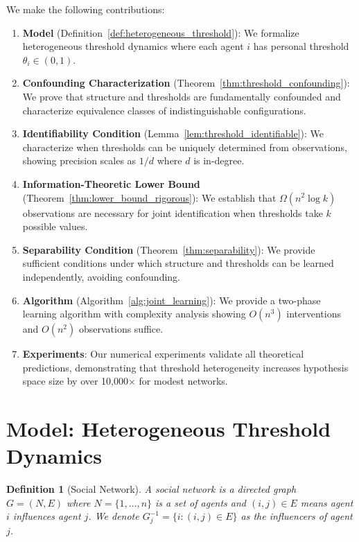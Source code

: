 \documentclass[11pt]{article}
\newtheorem{definition}{Definition}
\begin{document}
We make the following contributions:

\begin{enumerate}
\item \textbf{Model} (Definition~\ref{def:heterogeneous_threshold}): We formalize heterogeneous threshold dynamics where each agent $i$ has personal threshold $\theta_i \in (0,1)$.

\item \textbf{Confounding Characterization} (Theorem~\ref{thm:threshold_confounding}): We prove that structure and thresholds are fundamentally confounded and characterize equivalence classes of indistinguishable configurations.

\item \textbf{Identifiability Condition} (Lemma~\ref{lem:threshold_identifiable}): We characterize when thresholds can be uniquely determined from observations, showing precision scales as $1/d$ where $d$ is in-degree.

\item \textbf{Information-Theoretic Lower Bound} (Theorem~\ref{thm:lower_bound_rigorous}): We establish that $\Omega(n^2 \log k)$ observations are necessary for joint identification when thresholds take $k$ possible values.

\item \textbf{Separability Condition} (Theorem~\ref{thm:separability}): We provide sufficient conditions under which structure and thresholds can be learned independently, avoiding confounding.

\item \textbf{Algorithm} (Algorithm~\ref{alg:joint_learning}): We provide a two-phase learning algorithm with complexity analysis showing $O(n^3)$ interventions and $O(n^2)$ observations suffice.

\item \textbf{Experiments}: Our numerical experiments validate all theoretical predictions, demonstrating that threshold heterogeneity increases hypothesis space size by over 10,000$\times$ for modest networks.
\end{enumerate}

\section{Model: Heterogeneous Threshold Dynamics}
\label{sec:model}

\begin{definition}[Social Network]
A \emph{social network} is a directed graph $G = (N, E)$ where $N = \{1, \ldots, n\}$ is a set of agents and $(i,j) \in E$ means agent $i$ influences agent $j$. We denote $G_j^{-1} = \{i : (i,j) \in E\}$ as the influencers of agent $j$.
\end{definition}
\end{document}
